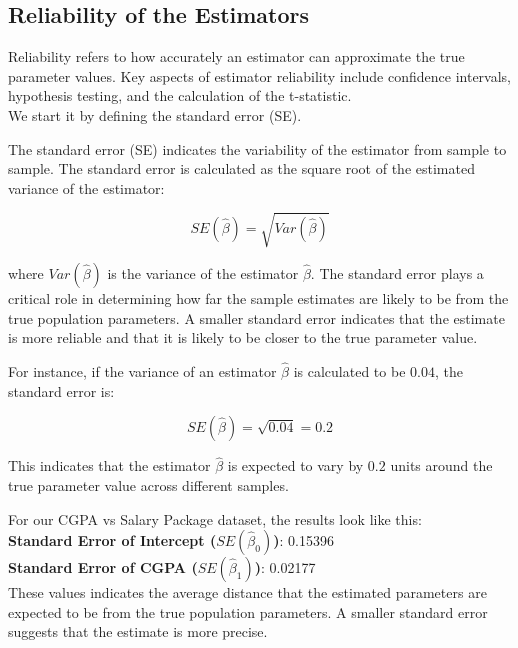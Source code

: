 \subsection{Reliability of the Estimators}

Reliability refers to how accurately an estimator can approximate the true parameter values. Key aspects of estimator reliability include confidence intervals, hypothesis testing, and the calculation of the t-statistic.\\

We start it by defining the standard error (SE).

\begin{definition}
    The standard error (SE) indicates the variability of the estimator from sample to sample. The standard error is calculated as the square root of the estimated variance of the estimator:

\[
SE(\hat{\beta}) = \sqrt{Var(\hat{\beta})}
\]

where \(Var(\hat{\beta})\) is the variance of the estimator \(\hat{\beta}\). The standard error plays a critical role in determining how far the sample estimates are likely to be from the true population parameters. A smaller standard error indicates that the estimate is more reliable and that it is likely to be closer to the true parameter value.
\end{definition}

For instance, if the variance of an estimator \(\hat{\beta}\) is calculated to be \(0.04\), the standard error is:

\[
SE(\hat{\beta}) = \sqrt{0.04} = 0.2
\]

This indicates that the estimator \(\hat{\beta}\) is expected to vary by \(0.2\) units around the true parameter value across different samples.

\begin{example}
    For our CGPA vs Salary Package dataset, the results look like this: \\

    \textbf{Standard Error of Intercept (\(SE(\hat{\beta}_0)\))}: 0.15396\\
    \textbf{Standard Error of CGPA (\(SE(\hat{\beta}_1)\))}: 0.02177\\

    These values indicates the average distance that the estimated parameters are expected to be from the true population parameters. A smaller standard error suggests that the estimate is more precise.
\end{example}

